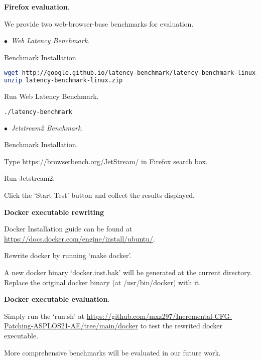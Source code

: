 \documentclass{sigplanconf}
\begin{document}
{\vspace{2pt}\noindent\textbf{Firefox evaluation}.

We provide two web-browser-base benchmarks for evaluation.

\vspace{1pt}\noindent$\bullet$\textit{~Web Latency Benchmark}.

Benchmark Installation.

\begin{lstlisting}[language=bash]
wget http://google.github.io/latency-benchmark/latency-benchmark-linux.zip
unzip latency-benchmark-linux.zip
\end{lstlisting}

Run Web Latency Benchmark.

\begin{lstlisting}[language=bash]
./latency-benchmark
\end{lstlisting}

\vspace{1pt}\noindent$\bullet$\textit{~Jetstream2 Benchmark}.

Benchmark Installation.

Type https://browserbench.org/JetStream/ in Firefox search box.

Run Jetstream2.

Click the `Start Test' button and collect the results displayed.

\vspace{2pt}\noindent\textbf{Docker executable rewriting}

Docker Installation guide can be found at \url{https://docs.docker.com/engine/install/ubuntu/}.

Rewrite docker by running `make docker'.

A new docker binary `docker.inst.bak' will be generated at the current directory. 
Replace the original docker binary (at /usr/bin/docker) with it.

\vspace{2pt}\noindent\textbf{Docker executable evaluation}.

Simply run the `run.sh' at \url{https://github.com/mxz297/Incremental-CFG-Patching-ASPLOS21-AE/tree/main/docker} 
to test the rewrited docker executable.

More comprehensive benchmarks will be evaluated in our future work.


}
\end{document}
